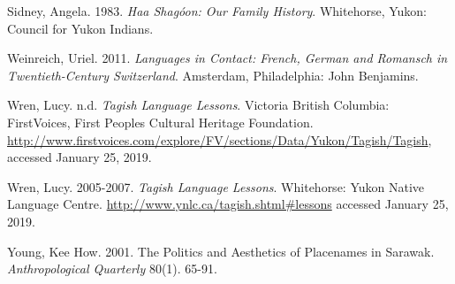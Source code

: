 \begin{hang}
Sidney, Angela. 1983. \textit{Haa Shagóon: Our Family History}. Whitehorse, Yukon: Council for Yukon Indians.

Weinreich, Uriel. 2011. \textit{Languages in Contact: French, German and Romansch in Twentieth-Century Switzerland}. Amsterdam, Philadelphia: John Benjamins.

Wren, Lucy. n.d. \textit{Tagish Language Lessons}. Victoria British Columbia: FirstVoices, First Peoples Cultural Heritage Foundation. \url{http://www.firstvoices.com/explore/FV/sections/Data/Yukon/Tagish/Tagish}, accessed January 25, 2019.

Wren, Lucy. 2005-2007.	\textit{Tagish Language Lessons}. Whitehorse: Yukon Native Language Centre.
\url{http://www.ynlc.ca/tagish.shtml\#lessons}
accessed January 25, 2019.

Young, Kee How. 2001. The Politics and Aesthetics of Placenames in Sarawak. \textit{Anthropological Quarterly} 80(1). 65-91.

\end{hang}


\label{moore-ch-end}
